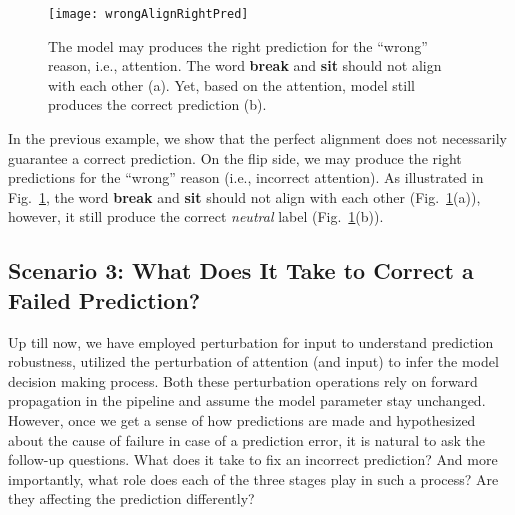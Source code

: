 \begin{figure}[htbp]
\centering
\vspace{-2mm}
 \texttt{[image: wrongAlignRightPred]}
 \caption{
The model may produces the right prediction for the ``wrong'' reason, i.e., attention.
The word \textbf{break} and \textbf{sit} should not align with each other (a). Yet, based on the attention, model still produces the correct prediction (b).
}
\label{fig:wrongAlignRightPred}
\end{figure}


In the previous example, we show that the perfect alignment does not necessarily guarantee a correct prediction.
%
On the flip side, we may produce the right predictions for the ``wrong'' reason (i.e., incorrect attention). 
As illustrated in Fig.~\ref{fig:wrongAlignRightPred}, the word \textbf{break} and \textbf{sit} should not align with each other (Fig.~\ref{fig:wrongAlignRightPred}(a)), however, it still produce the correct \emph{neutral} label (Fig.~\ref{fig:wrongAlignRightPred}(b)).
%






\subsection{Scenario 3: What Does It Take to Correct a Failed Prediction?}
Up till now, we have employed perturbation for input to understand prediction robustness, utilized the perturbation of attention (and input) to infer the model decision making process. Both these perturbation operations rely on forward propagation in the pipeline and assume the model parameter stay unchanged.
%
However, once we get a sense of how predictions are made and hypothesized about the cause of failure in case of a prediction error, it is natural to ask the follow-up questions. What does it take to fix an incorrect prediction? And more importantly, what role does each of the three stages play in such a process? Are they affecting the prediction differently?

